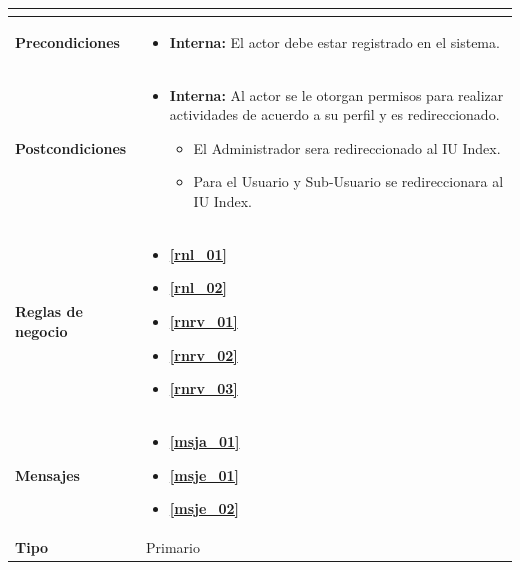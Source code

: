 \begin{center}
\begin{longtable}{| p{3.5cm} | p{11.5cm} |}
\begin{itemize}
            \end{itemize} \\
        \hline	
          \textbf{Precondiciones}& 
            \begin{itemize}
              \item \textbf{Interna:} El actor debe estar registrado en el sistema.
            \end{itemize} \\
        \hline	
          \textbf{Postcondiciones} & 
            \begin{itemize}
              \item \textbf{Interna:} Al actor se le otorgan permisos para realizar actividades de acuerdo a su perfil y es redireccionado. 
		\begin{itemize}
			\item El Administrador sera redireccionado al IU Index.
			\item Para el Usuario y Sub-Usuario se redireccionara al IU Index.
		\end{itemize}
            \end{itemize} \\
       \hline
         \textbf{Reglas de negocio} & 
         	\begin{itemize}
         	  \item \textbf{\ref{rnl_01}}
         	  \item \textbf{\ref{rnl_02}}
         	  \item \textbf{\ref{rnrv_01}}
         	  \item \textbf{\ref{rnrv_02}}
         	  \item \textbf{\ref{rnrv_03}}
	 \end{itemize} \\
       \hline
         \textbf{Mensajes} & 
         	\begin{itemize}
         	  \item \textbf{\ref{msja_01}}
         	  \item \textbf{\ref{msje_01}}
         	  \item \textbf{\ref{msje_02}}
	 \end{itemize} \\
       \hline
         \textbf{Tipo} & Primario \\
    \hline	    
  \end{longtable}
\end{center}
\endgroup

